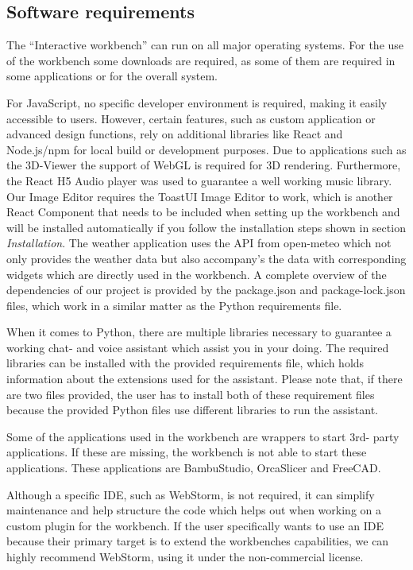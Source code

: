 \documentclass[a4paper,12pt]{article}
\begin{document}
\newpage
\subsection{Software requirements}
The “Interactive workbench” can run on all major operating systems. For the use of the workbench some downloads are required, as some of them are required in some applications or for the overall system. 

For JavaScript, no specific developer environment is required, making it easily accessible to users. However, certain features, such as custom application or advanced design functions, rely on additional libraries like React and Node.js/npm for local build or development purposes. Due to applications such as the 3D-Viewer the support of WebGL\cite{webgl} is required for 3D rendering. 
Furthermore, the React H5 Audio player\cite{reacth5audio} was used to guarantee a well working music library. Our Image Editor requires the ToastUI Image Editor to work, which is another React Component that needs to be included when setting up the workbench and will be installed automatically if you follow the installation steps shown in section \textit{Installation}. The weather application uses the API from open-meteo\cite{openmeteo} which not only provides the weather data but also accompany's the data with corresponding widgets which are directly used in the workbench. 
A complete overview of the dependencies of our project is provided by the package.json and package-lock.json files, which work in a similar matter as the Python requirements file. 

When it comes to Python, there are multiple libraries necessary to guarantee a working chat- and voice assistant which assist you in your doing. The required libraries can be installed with the provided requirements file, which holds information about the extensions used for the assistant. Please note that, if there are two files provided, the user has to install both of these requirement files because the provided Python files use different libraries to run the assistant.

Some of the applications used in the workbench are wrappers to start 3rd- party applications. If these are missing, the workbench is not able to start these applications. These applications are BambuStudio, OrcaSlicer and FreeCAD. 

Although a specific IDE, such as WebStorm, is not required, it can simplify maintenance and help structure the code which helps out when working on a custom plugin for the workbench. 
If the user specifically wants to use an IDE because their primary target is to extend the workbenches capabilities, we can highly recommend WebStorm, using it under the non-commercial license.  
\end{document}

